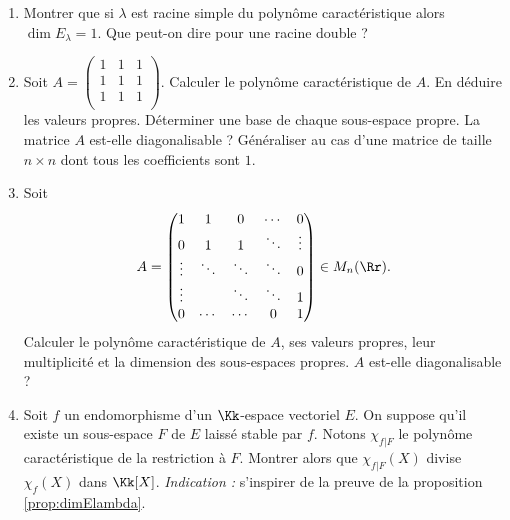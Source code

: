 \documentclass[12pt, class=report,crop=false]{standalone}
\begin{document}
\begin{miniexercices}
\sauteligne
\begin{enumerate}
  \item Montrer que si $\lambda$ est racine simple du polynôme caractéristique alors
  $\dim E_\lambda = 1$. Que peut-on dire pour une racine double ? 
  
  \item Soit $A = \left( \begin{smallmatrix} 1&1&1\\1&1&1\\1&1&1\\\end{smallmatrix}\right)$. Calculer le polynôme caractéristique de $A$. En déduire les valeurs propres.
Déterminer une base de chaque sous-espace propre.
La matrice $A$ est-elle diagonalisable ? Généraliser au cas d'une matrice de taille $n\times n$ dont tous les coefficients sont $1$.


  \item 
 
Soit
\[ A = \begin{pmatrix}
1&1&0&\cdots&0\\
0&1&1&\ddots&\vdots\\
\vdots&\ddots&\ddots&\ddots&0\\
\vdots&&\ddots&\ddots&1\\
0&\cdots&\cdots&0&1
\end{pmatrix} \in M_n(\Rr). \]
Calculer le polynôme caractéristique de $A$, ses valeurs propres, leur multiplicité et la dimension des sous-espaces propres.
$A$ est-elle diagonalisable ?


  \item Soit $f$ un endomorphisme d'un $\Kk$-espace vectoriel $E$. On suppose qu'il existe un sous-espace $F$ de $E$ laissé stable par $f$. Notons $\chi_{f | F}$ le polynôme caractéristique de la restriction à $F$. Montrer alors que $\chi_{f | F}(X)$ divise $\chi_f(X)$ dans $\Kk[X]$.
  \emph{Indication :} s'inspirer de la preuve de la proposition \ref{prop:dimElambda}.

\end{enumerate}
\end{miniexercices}







\finchapitre 
\end{document}
